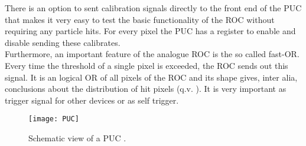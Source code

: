 \documentclass[british,11pt,a4paper]{memoir}
\begin{document}
There is an option to sent calibration signals directly to the front end of the \ac{PUC} that makes it very easy to test the basic functionality of the \ac{ROC} without requiring any particle hits. For every pixel the \ac{PUC} has a register to enable and disable sending these calibrates.\\
Furthermore, an important feature of the analogue \ac{ROC} is the so called fast-OR. Every time the threshold of a single pixel is exceeded, the \ac{ROC} sends out this signal. It is an logical OR of all pixels of the \ac{ROC} and its shape gives, inter alia, conclusions about the distribution of hit pixels (q.v. ). It is very important as trigger signal for other devices or as self trigger.
\begin{figure}[ht]
	\texttt{[image: PUC]}
	\caption{Schematic view of a \ac{PUC} \cite{dambach}.}
	\label{p9}
\end{figure}
\end{document}

